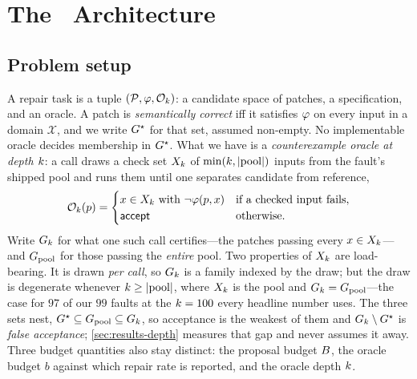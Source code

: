 \section{The \CEGMem\ Architecture}
\label{sec:arch}

\subsection{Problem setup}
A repair task is a tuple $(\mathcal{P}, \varphi, \mathcal{O}_{k})$: a candidate space of patches, a
specification, and an oracle. A patch is \emph{semantically correct} iff it
satisfies $\varphi$ on every input in a domain $\mathcal{X}$, and we write
$G^{\star}$ for that set, assumed non-empty. No implementable oracle decides
membership in $G^{\star}$. What we have is a \emph{counterexample oracle at depth
$k$}: a call draws a check set $X_{k}$ of
$\min(k, \lvert\mathrm{pool}\rvert)$ inputs from the fault's shipped
pool and runs them until one separates candidate from reference,
\begin{equation}
\mathcal{O}_{k}(p) =
\begin{cases}
x \in X_{k} \text{ with } \lnot\varphi(p, x) & \text{if a checked input fails},\\
\textsf{accept} & \text{otherwise}.
\end{cases}
\label{eq:oracle}
\end{equation}
Write $G_{k}$ for what one such call certifies---the patches passing every
$x \in X_{k}$---and $G_{\mathrm{pool}}$ for those passing the \emph{entire} pool. Two
properties of $X_{k}$ are load-bearing. It is drawn \emph{per call}, so $G_{k}$ is
a family indexed by the draw; but the draw is degenerate whenever
$k \ge \lvert\mathrm{pool}\rvert$, where $X_{k}$ is the pool and
$G_{k} = G_{\mathrm{pool}}$---the case for $97$ of our $99$ faults at the
$k = 100$ every headline number uses. The three
sets nest, $G^{\star} \subseteq G_{\mathrm{pool}} \subseteq G_{k}$, so acceptance is the
weakest of them and $G_{k} \setminus G^{\star}$ is \emph{false acceptance};
\cref{sec:results-depth} measures that gap and never assumes it away. Three budget quantities also stay distinct: the proposal budget
$B$, the oracle budget $b$ against which repair rate is reported, and the
oracle depth $k$.

\ifsuppmatter\else\fi

